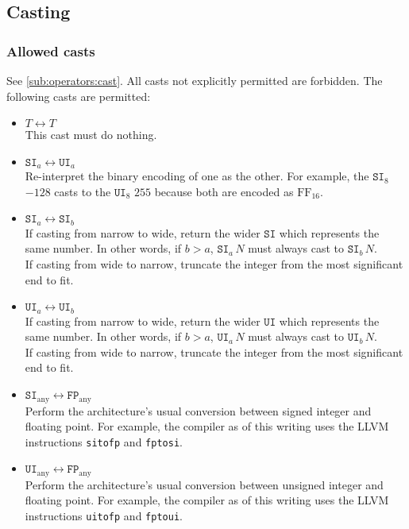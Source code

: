 \documentclass{article}
\newcommand{\R}[1]{\mathtt{#1}}
\newcommand{\both}{\leftrightarrow}
\begin{document}
\subsection{Casting}
\label{sub:types:casting}
\subsubsection{Allowed casts}
See \ref{sub:operators:cast}.
All casts not explicitly permitted are forbidden. The following casts are
permitted:
\begin{itemize}
  \item{$T \both T$ \\
    This cast must do nothing.}
  \item{$\R{SI}_a \both \R{UI}_a$ \\
    Re-interpret the binary encoding of one as the other. For example,
    the $\R{SI}_8$ $-128$ casts to the $\R{UI}_8$ $255$ because both are
    encoded as $\mathrm{FF}_{16}$.}
  \item{$\R{SI}_a \both \R{SI}_b$ \\
    If casting from narrow to wide, return the wider $\R{SI}$ which represents
    the same number. In other words, if $b > a$, $\R{SI}_a\,N$ must always cast
    to $\R{SI}_b\,N$. \\
    If casting from wide to narrow, truncate the integer from the most
    significant end to fit.}
  \item{$\R{UI}_a \both \R{UI}_b$ \\
    If casting from narrow to wide, return the wider $\R{UI}$ which represents
    the same number. In other words, if $b > a$, $\R{UI}_a\,N$ must always cast
    to $\R{UI}_b\,N$. \\
    If casting from wide to narrow, truncate the integer from the most
    significant end to fit.}
  \item{$\R{SI}_\mathrm{any} \both \R{FP}_\mathrm{any}$ \\
    Perform the architecture's usual conversion between signed integer and
    floating point. For example, the compiler as of this writing uses the
    LLVM instructions \texttt{sitofp} and \texttt{fptosi}.}
  \item{$\R{UI}_\mathrm{any} \both \R{FP}_\mathrm{any}$ \\
    Perform the architecture's usual conversion between unsigned integer and
    floating point. For example, the compiler as of this writing uses the
    LLVM instructions \texttt{uitofp} and \texttt{fptoui}.}

\end{itemize}
\end{document}
